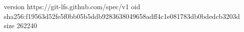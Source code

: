 version https://git-lfs.github.com/spec/v1
oid sha256:f19563d52fe5f0bb05b5ddb9283638049658adff4c1e081783db0bdedcb3203d
size 262240
